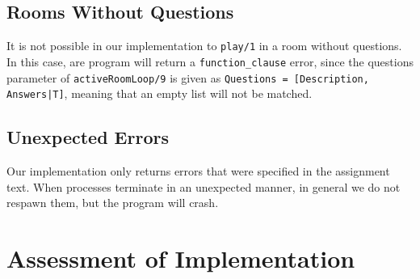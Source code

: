 \documentclass{article}
\begin{document}
\subsection{Rooms Without Questions}
It is not possible in our implementation to \texttt{play/1} in a room without questions. In this case, are program will return a  \texttt{function\_clause} error, since the questions parameter of \texttt{activeRoomLoop/9} is given as \texttt{Questions = [{Description, Answers}|T]}, meaning that an empty list will not be matched.

\subsection{Unexpected Errors}
Our implementation only returns errors that were specified in the assignment text. When processes terminate in an unexpected manner, in general we do not respawn them, but the program will crash.

\section{Assessment of Implementation}
\end{document}

